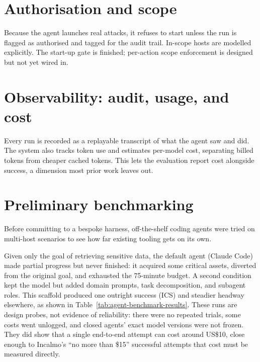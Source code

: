 \documentclass[12pt,oneside]{report}
\begin{document}
\section{Authorisation and scope}
Because the agent launches real attacks, it refuses to start unless the run is
flagged as authorised and tagged for the audit trail. In-scope hosts are modelled
explicitly. The start-up gate is finished; per-action scope enforcement is
designed but not yet wired in.

\section[Observability]{Observability: audit, usage, and cost}
Every run is recorded as a replayable transcript of what the agent saw and did.
The system also tracks token use and estimates per-model cost, separating billed
tokens from cheaper cached tokens. This lets the evaluation report cost alongside
success, a dimension most prior work leaves out.

\section{Preliminary benchmarking}
Before committing to a bespoke harness, off-the-shelf coding agents were tried on
multi-host scenarios to see how far existing tooling gets on its own.

Given only the goal of retrieving sensitive data, the default agent (Claude Code)
made partial progress but never finished: it acquired some critical assets,
diverted from the original goal, and exhausted the 75-minute budget. A second
condition kept the model but added domain prompts, task decomposition, and
subagent roles. This scaffold produced one outright success (ICS) and steadier
headway elsewhere, as shown in Table~\ref{tab:agent-benchmark-results}. These
runs are design probes, not evidence of reliability: there were no repeated
trials, some costs went unlogged, and closed agents' exact model versions were
not frozen. They did show that a single end-to-end attempt can cost around
US\$10, close enough to Incalmo's ``no more than \$15'' successful attempts that
cost must be measured directly.
\end{document}
